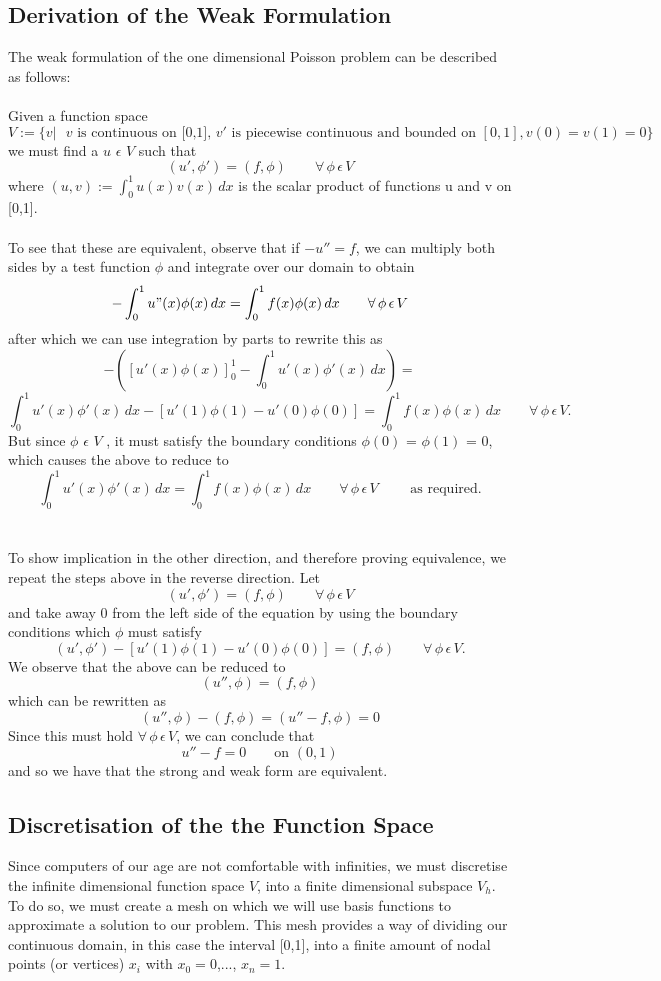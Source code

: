 \documentclass{article}
\begin{document}
\subsection{Derivation of the Weak Formulation}
The weak formulation of the one dimensional Poisson problem can be described as follows:\\
\\
Given a function space 
$$ V := \{v| \textrm{ $v$ is continuous on [0,1], $v'$ is piecewise continuous and bounded on } [0,1],  v(0) = v(1) = 0 \} $$
we must find a $u$ $\epsilon$ $V$ such that 
\[(u',\phi ') = (f , \phi) \qquad\forall\,\phi\, \epsilon\, V\]
where 
$(u,v) := \int_{0}^{1} u(x)v(x) \,dx $
is the scalar product of functions u and v on [0,1].\\
\\
To see that these are equivalent, observe that if $-u'' = f$, we can multiply both sides by a test function $\phi$ and integrate over our domain to obtain 
\[-\int_{0}^{1} u"(x)\phi(x) \,dx = \int_{0}^{1} f(x)\phi(x) \,dx \qquad\forall\,\phi\, \epsilon\, V\]
after which we can use integration by parts to rewrite this as
\[- ( [u'(x)\phi(x)]_0^1 - \int_{0}^{1} u'(x)\phi'(x) \,dx ) = \]
\[\int_{0}^{1} u'(x)\phi'(x) \,dx - [ u'(1)\phi(1) - u'(0)\phi(0) ] = \int_{0}^{1} f(x)\phi(x) \,dx
\qquad\forall\,\phi\, \epsilon\, V. \]
But since $\phi$ $\epsilon$ $V$ , it must satisfy the boundary conditions $\phi(0)$ = $\phi(1)$ = 0, which causes the above to reduce to
\[\int_{0}^{1} u'(x)\phi'(x) \,dx  = \int_{0}^{1} f(x)\phi(x) \,dx \qquad\forall\,\phi\, \epsilon\, V \qquad\textrm{ as required.}\] 
\\
\\
To show implication in the other direction, and therefore proving equivalence, we repeat the steps above in the reverse direction. Let 
\[(u',\phi ') = (f , \phi) \qquad\forall\,\phi\, \epsilon\, V  \]
and take away 0 from the left side of the equation by using the boundary conditions which $\phi$ must satisfy
\[(u',\phi ') - [u'(1)\phi(1) - u'(0)\phi(0)] = (f , \phi) \qquad\forall\,\phi\, \epsilon\, V.  \]
We observe that the above can be reduced to 
\[(u'',\phi ) = (f , \phi) \]
which can be rewritten as 
\[(u'',\phi ) - (f , \phi) = (u'' - f,\phi )   = 0 \]
Since this must hold $\forall\,\phi\, \epsilon\, V$, we can conclude that
\[u'' - f = 0 \qquad \textrm{on }(0,1)\]
and so we have that the strong and weak form are equivalent. 
\subsection{Discretisation of the the Function Space}
Since computers of our age are not comfortable with infinities, we must discretise the infinite dimensional function space $V$, into a finite dimensional subspace $V_h$. To do so, we must create a mesh on which we will use basis functions to approximate a solution to our problem. This mesh provides a way of dividing our continuous domain, in this case the interval [0,1], into a finite amount of nodal points (or vertices) $x_i$ with 
$x_0 = 0$,..., $x_{n} = 1$.
\end{document}
